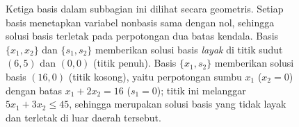 \begin{figure}[h!]
\begin{center}
\end{center}
\caption{Ketiga basis dalam subbagian ini dilihat secara geometris.  Setiap basis menetapkan variabel nonbasis sama dengan nol, sehingga solusi basis terletak pada perpotongan dua batas kendala.  Basis $\{x_1,x_2\}$ dan $\{s_1,s_2\}$ memberikan solusi basis \emph{layak} di titik sudut $(6,5)$ dan $(0,0)$ (titik penuh).  Basis $\{x_1,s_2\}$ memberikan solusi basis $(16,0)$ (titik kosong), yaitu perpotongan sumbu $x_1$ ($x_2=0$) dengan batas $x_1+2x_2=16$ ($s_1=0$); titik ini melanggar $5x_1+3x_2\le 45$, sehingga merupakan solusi basis yang tidak layak dan terletak di luar daerah tersebut.}
\label{fig:matrix-bases-geometry}
\end{figure}

